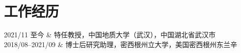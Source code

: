 \section{工作经历}

\begin{EntriesTable}{0.18}{0.02}{0.80}
2021/11 至今     & 特任教授，中国地质大学（武汉），中国湖北省武汉市 \\
2018/08--2021/09 & 博士后研究助理，密西根州立大学，美国密西根州东兰辛 \\
\end{EntriesTable}
